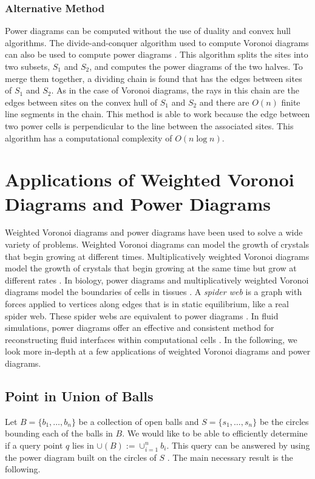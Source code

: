 \documentclass[a4paper, 11pt]{article}
\begin{document}
\subsubsection{Alternative Method}

Power diagrams can be computed without the use of duality and convex hull algorithms. The divide-and-conquer algorithm used to compute Voronoi
diagrams can also be used to compute power diagrams \cite{imai_power}. This algorithm splits the sites into two subsets, $S_1$ and $S_2$, and
computes the power diagrams of the two halves. To
merge them together, a dividing chain is found that has the edges between sites of $S_1$ and $S_2$. As in the case of Voronoi diagrams, the rays
in this chain are the edges between sites on the convex hull of $S_1$ and $S_2$ and there are $O(n)$ finite line segments in the chain. This method
is able to work because the edge between two power cells is perpendicular to the line between the associated sites. This algorithm has a computational
complexity of $O(n \log n)$.

\section{Applications of Weighted Voronoi Diagrams and Power Diagrams}

Weighted Voronoi diagrams and power diagrams have been used to solve a wide variety of problems. Weighted Voronoi diagrams can model the
growth of crystals that begin growing at different times. Multiplicatively weighted Voronoi diagrams model the growth of crystals that
begin growing at the same time but grow at different rates \cite{aurenhammer_survey}. In biology, power diagrams and multiplicatively
weighted Voronoi diagrams model the boundaries of cells in tissues \cite{cell}. A \textit{spider web} is a graph with forces applied to vertices along
edges that is in static equilibrium, like a real spider web. These spider webs are equivalent to power diagrams \cite{spider}. In fluid simulations, power diagrams offer an effective and consistent
method for reconstructing fluid interfaces within computational cells \cite{fluids}. In the following, we look more in-depth at a few applications of weighted Voronoi
diagrams and power diagrams.

\subsection{Point in Union of Balls}

Let $B = \{b_1,\dots, b_n\}$ be a collection of open balls and $S = \{s_1, \dots, s_n\}$ be the circles bounding each of the balls in $B$. We would
like to be able to efficiently determine if a query point $q$ lies in $\cup(B) := \cup_{i=1}^n b_i$. This query can be answered by using the power diagram
built on the circles of $S$ \cite{aurenhammer_discs}. The main necessary result is the following.
\end{document}
